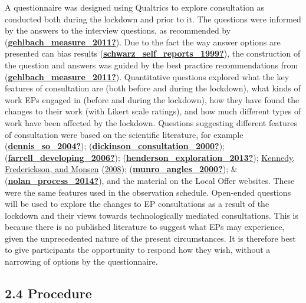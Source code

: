 \documentclass[
]{article}
\begin{document}
A questionnaire was designed using Qualtrics to explore consultation as
conducted both during the lockdown and prior to it. The questions were
informed by the answers to the interview questions, as recommended by
(\protect\hyperlink{ref-gehlbach_measure_2011}{\textbf{gehlbach\_measure\_2011?}}).
Due to the fact the way answer options are presented can bias results
(\protect\hyperlink{ref-schwarz_self_reports_1999}{\textbf{schwarz\_self\_reports\_1999?}}),
the construction of the question and answers was guided by the best
practice recommendations from
(\protect\hyperlink{ref-gehlbach_measure_2011}{\textbf{gehlbach\_measure\_2011?}}).
Quantitative questions explored what the key features of consultation
are (both before and during the lockdown), what kinds of work EPs
engaged in (before and during the lockdown), how they have found the
changes to their work (with Likert scale ratings), and how much
different types of work have been affected by the lockdown. Questions
suggesting different features of consultation were based on the
scientific literature, for example
(\protect\hyperlink{ref-dennis_so_2004}{\textbf{dennis\_so\_2004?}});
(\protect\hyperlink{ref-dickinson_consultation_2000}{\textbf{dickinson\_consultation\_2000?}});
(\protect\hyperlink{ref-farrell_developing_2006}{\textbf{farrell\_developing\_2006?}});
(\protect\hyperlink{ref-henderson_exploration_2013}{\textbf{henderson\_exploration\_2013?}});
\protect\hyperlink{ref-kennedyEducationalPsychologistsWalk2008}{Kennedy,
Frederickson, and Monsen}
(\protect\hyperlink{ref-kennedyEducationalPsychologistsWalk2008}{2008});
(\protect\hyperlink{ref-munro_angles_2000}{\textbf{munro\_angles\_2000?}});
\&
(\protect\hyperlink{ref-nolan_process_2014}{\textbf{nolan\_process\_2014?}}),
and the material on the Local Offer websites. These were the same
features used in the observation schedule. Open-ended questions will be
used to explore the changes to EP consultations as a result of the
lockdown and their views towards technologically mediated consultations.
This is because there is no published literature to suggest what EPs may
experience, given the unprecedented nature of the present circumstances.
It is therefore best to give participants the opportunity to respond how
they wish, without a narrowing of options by the questionnaire.

\hypertarget{procedure}{%
\subsection{2.4 Procedure}\label{procedure}}
\end{document}
